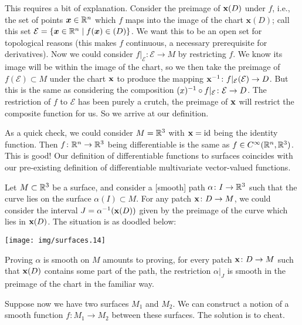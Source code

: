 \begin{remark}
This requires a bit of explanation. Consider the preimage of
$\mathbf{x}(D)$ under $f$, i.e., the set of points $\boldsymbol{x}\in\mathbb{R}^{n}$
which $f$ maps into the image of the chart $\mathbf{x}(D)$; call this
set $\mathcal{E} = \{\boldsymbol{x}\in\mathbb{R}^{n}\mid f(\boldsymbol{x})\in\mathbf{(}D)\}$.
We want this to be an open set for topological reasons (this makes $f$
continuous, a necessary prerequisite for derivatives). Now we could
consider $f|_{\mathcal{E}}\colon\mathcal{E}\to M$ by restricting $f$.
We know its image will be within the image of the chart, so we
then take the preimage of $f(\mathcal{E})\subset M$ under the chart
$\mathbf{x}$ to produce the mapping
$\mathbf{x}^{-1}\colon f|_{\mathcal{E}}(\mathcal{E})\to D$.
But this is the same as considering the composition
$\mathbf{(}x)^{-1}\circ f|_{\mathcal{E}}\colon\mathcal{E}\to D$.
The restriction of $f$ to $\mathcal{E}$ has been purely a crutch, the
preimage of $\mathbf{x}$ will restrict the composite function for us. So
we arrive at our definition.
\end{remark}

\begin{remark}
As a quick check, we could consider $M=\mathbb{R}^{3}$ with $\mathbf{x}=\mathrm{id}$
being the identity function. Then $f\colon\mathbb{R}^{n}\to\mathbb{R}^{3}$ being
differentiable is the same as $f\in C^{\infty}(\mathbb{R}^{n},\mathbb{R}^{3})$. This
is good! Our definition of differentiable functions to surfaces
coincides with our pre-existing definition of differentiable
multivariate vector-valued functions.
\end{remark}

\begin{example}
Let $M\subset\mathbb{R}^{3}$ be a surface, and consider a [smooth] path
$\alpha\colon I\to\mathbb{R}^{3}$
such that the curve lies on the surface $\alpha(I)\subset M$.
For any patch $\mathbf{x}\colon D\to M$, we could consider 
the interval $J=\alpha^{-1}(\mathbf{x}(D))$ given by the preimage of the
curve which lies in $\mathbf{x}(D)$. The situation is as doodled below:
\begin{center}
  \texttt{[image: img/surfaces.14]}
\end{center}
Proving $\alpha$ is smooth on $M$ amounts to proving, for every patch
$\mathbf{x}\colon D\to M$ such that $\mathbf{x}(D)$ contains some part of
the path, the restriction $\alpha|_{J}$ is smooth in the preimage of the
chart in the familiar way. 
\end{example}

Suppose now we have two surfaces $M_{1}$ and $M_{2}$. We can construct a
notion of a smooth function $f\colon M_{1}\to M_{2}$ between these
surfaces. The solution is to cheat.


